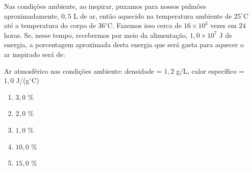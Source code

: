 Nas condições ambiente, ao inspirar, puxamos para nossos pulmões aproximadamente, $0,5$ L de ar, então aquecido na temperatura ambiente de $25^\circ$C até a temperatura do corpo de $36^\circ$C.
Fazemos isso cerca de $16 \times 10^3$ vezes em $24$ horas.
Se, nesse tempo, recebermos por meio da alimentação, $1,0 \times 10^7$ J de energia, a porcentagem aproximada desta energia que será gasta para aquecer o ar inspirado será de:

Ar atmosférico nas condições ambiente:
densidade = $1,2$ g/L, calor específico = $1,0$ J/(g$^\circ$C)

\begin{enumerate}[label=(\alph*)]
	\item $3,0$  \%			
	\item $2,0$  \%			
	\item $1,0$  \%		
	\item $10,0$ \%
	\item $15,0$ \%
\end{enumerate}
